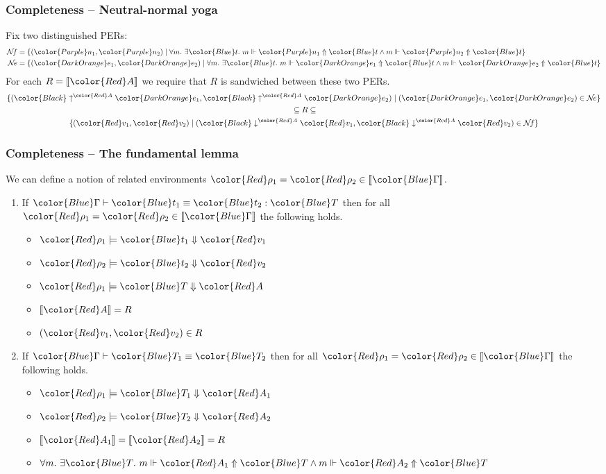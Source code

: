 \documentclass[svgnames]{beamer}
\newcommand\fmttm[1]{{\color{Blue}#1}}
\newcommand\fmtval[1]{{\color{Red}#1}}
\newcommand\fmtne[1]{{\color{DarkOrange}#1}}
\newcommand\fmtnf[1]{{\color{Purple}#1}}
\newcommand{\sem}[1]{\llbracket #1 \rrbracket}
\newcommand{\vup}[2]{{\color{Black} \uparrow^{\fmtval{#1}} \fmtne{#2}}}
\newcommand{\vnf}[2]{{\color{Black} \downarrow^{\fmtval{#1}} \fmtval{#2}}}
\newcommand{\eqterm}[4]{\fmttm{#1} \vdash \fmttm{#2} \equiv \fmttm{#3} : \fmttm{#4}}
\newcommand{\eqtype}[3]{\fmttm{#1}\vdash\fmttm{#2} \equiv \fmttm{#3}}
\newcommand{\Nf}{\mathcal{N}\!f}
\newcommand{\Ne}{\mathcal{N}\!e}
\newcommand{\gpheval}[3]{\fmtval{#1}\models\fmttm{#2}\Downarrow\fmtval{#3}}
\newcommand{\gphquone}[3]{#1\Vdash\fmtne{#2}\Uparrow\fmttm{#3}}
\newcommand{\gphquotp}[3]{#1\Vdash\fmtval{#2}\Uparrow\fmttm{#3}}
\newcommand{\gphquonf}[3]{#1\Vdash\fmtnf{#2}\Uparrow\fmttm{#3}}
\begin{document}
\begin{frame}
  \frametitle{Completeness -- Neutral-normal yoga}
  Fix two distinguished PERs:
  \begin{align*}
    \Nf &= \{(\fmtnf{n_1}, \fmtnf{n_2}) \mid \forall m.\ \exists \fmttm{t}.\ \gphquonf{m}{n_1}{t} \land \gphquonf{m}{n_2}{t}\}\\
    \Ne &= \{(\fmtne{e_1}, \fmtne{e_2}) \mid \forall m.\ \exists \fmttm{t}.\ \gphquone{m}{e_1}{t} \land \gphquone{m}{e_2}{t}\}\\
  \end{align*}
  For each $R = \sem{\fmtval{A}}$ we require that $R$ is sandwiched between these two PERs.
  \begin{gather*}
    \{(\vup{A}{e_1}, \vup{A}{e_2}) \mid (\fmtne{e_1}, \fmtne{e_2}) \in \Ne\}\\
    {}\subseteq R \subseteq\\
    \{(\fmtval{v_1}, \fmtval{v_2}) \mid (\vnf{A}{v_1}, \vnf{A}{v_2}) \in \Nf\}
  \end{gather*}
\end{frame}

\begin{frame}
  \frametitle{Completeness -- The fundamental lemma}
  We can define a notion of related environments
  $\fmtval{\rho_1} = \fmtval{\rho_2} \in \sem{\fmttm{\Gamma}}$.

  \begin{enumerate}
  \item If $\eqterm{\Gamma}{t_1}{t_2}{T}$ then for all
    $\fmtval{\rho_1} = \fmtval{\rho_2} \in \sem{\fmttm{\Gamma}}$ the following holds.
    \begin{itemize}
    \item $\gpheval{\rho_1}{t_1}{v_1}$
    \item $\gpheval{\rho_2}{t_2}{v_2}$
    \item $\gpheval{\rho_1}{T}{A}$
    \item $\sem{\fmtval{A}} = R$
    \item $(\fmtval{v_1}, \fmtval{v_2}) \in R$
    \end{itemize}
  \item If $\eqtype{\Gamma}{T_1}{T_2}$ then for all
    $\fmtval{\rho_1} = \fmtval{\rho_2} \in \sem{\fmttm{\Gamma}}$ the following holds.
    \begin{itemize}
    \item $\gpheval{\rho_1}{T_1}{A_1}$
    \item $\gpheval{\rho_2}{T_2}{A_2}$
    \item $\sem{\fmtval{A_1}} = \sem{\fmtval{A_2}} = R$
    \item $\forall m.\ \exists \fmttm{T}.\ \gphquotp{m}{A_1}{T} \land \gphquotp{m}{A_2}{T}$
    \end{itemize}
  \end{enumerate}
\end{frame}
\end{document}
